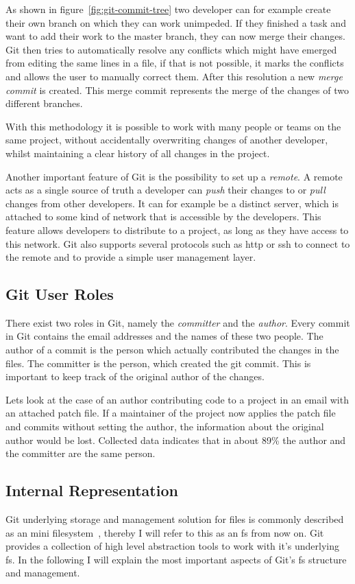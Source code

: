 As shown in figure~\ref{fig:git-commit-tree} two developer can for example create their own branch on which they can work unimpeded.
If they finished a task and want to add their work to the master branch, they can now merge their changes.
Git then tries to automatically resolve any conflicts which might have emerged from editing the same lines in a file, if that is not possible, it marks the conflicts and allows the user to manually correct them.
After this resolution a new \emph{merge commit} is created. This merge commit represents the merge of the changes of two different branches.

With this methodology it is possible to work with many people or teams on the same project, without accidentally overwriting changes of another developer, whilst maintaining a clear history of all changes in the project.

Another important feature of Git is the possibility to set up a \emph{remote}.
A remote acts as a single source of truth a developer can \emph{push} their changes to or \emph{pull} changes from other developers.
It can for example be a distinct server, which is attached to some kind of network that is accessible by the developers.
This feature allows developers to distribute to a project, as long as they have access to this network.
Git also supports several protocols such as \ac{http} or \ac{ssh} to connect to the remote and to provide a simple user management layer.


\subsection{Git User Roles}
There exist two roles in Git, namely the \emph{committer} and the \emph{author}.
Every commit in Git contains the email addresses and the names of these two people.
The author of a commit is the person which actually contributed the changes in the files.
The committer is the person, which created the git commit.
This is important to keep track of the original author of the changes.

Lets look at the case of an author contributing code to a project in an email with an attached patch file.
If a maintainer of the project now applies the patch file and commits without setting the author, the information about the original author would be lost.
Collected data indicates that in about 89\% the author and the committer are the same person.


\subsection{Internal Representation}
Git underlying storage and management solution for files is commonly described as an mini filesystem~\cite[p.~9]{book:pro-git}, thereby I will refer to this as an \ac{fs} from now on.
Git provides a collection of high level abstraction tools to work with it's underlying \ac{fs}.
In the following I will explain the most important aspects of Git's \ac{fs} structure and management.

